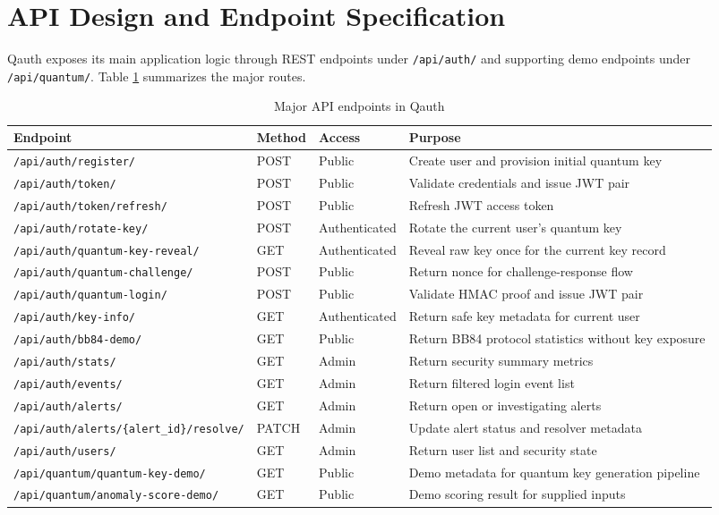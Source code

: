 \documentclass[12pt,a4paper]{report}
\begin{document}
\section{API Design and Endpoint Specification}
Qauth exposes its main application logic through REST endpoints under \texttt{/api/auth/} and supporting demo endpoints under \texttt{/api/quantum/}. Table \ref{tab:api-endpoints} summarizes the major routes.

\begin{table}[H]
\centering
\scriptsize
\caption{Major API endpoints in Qauth}
\label{tab:api-endpoints}
\begin{tabular}{|p{4.5cm}|p{1.2cm}|p{2.0cm}|p{6.5cm}|}
\hline
\textbf{Endpoint} & \textbf{Method} & \textbf{Access} & \textbf{Purpose} \\
\hline
\texttt{/api/auth/register/} & POST & Public & Create user and provision initial quantum key \\
\hline
\texttt{/api/auth/token/} & POST & Public & Validate credentials and issue JWT pair \\
\hline
\texttt{/api/auth/token/refresh/} & POST & Public & Refresh JWT access token \\
\hline
\texttt{/api/auth/rotate-key/} & POST & Authenticated & Rotate the current user's quantum key \\
\hline
\texttt{/api/auth/quantum-key-reveal/} & GET & Authenticated & Reveal raw key once for the current key record \\
\hline
\texttt{/api/auth/quantum-challenge/} & POST & Public & Return nonce for challenge-response flow \\
\hline
\texttt{/api/auth/quantum-login/} & POST & Public & Validate HMAC proof and issue JWT pair \\
\hline
\texttt{/api/auth/key-info/} & GET & Authenticated & Return safe key metadata for current user \\
\hline
\texttt{/api/auth/bb84-demo/} & GET & Public & Return BB84 protocol statistics without key exposure \\
\hline
\texttt{/api/auth/stats/} & GET & Admin & Return security summary metrics \\
\hline
\texttt{/api/auth/events/} & GET & Admin & Return filtered login event list \\
\hline
\texttt{/api/auth/alerts/} & GET & Admin & Return open or investigating alerts \\
\hline
\texttt{/api/auth/alerts/\{alert\_id\}\allowbreak/resolve/} & PATCH & Admin & Update alert status and resolver metadata \\
\hline
\texttt{/api/auth/users/} & GET & Admin & Return user list and security state \\
\hline
\texttt{/api/quantum/quantum-key-demo/} & GET & Public & Demo metadata for quantum key generation pipeline \\
\hline
\texttt{/api/quantum/anomaly-score-demo/} & GET & Public & Demo scoring result for supplied inputs \\
\hline
\end{tabular}
\end{table}
\end{document}
